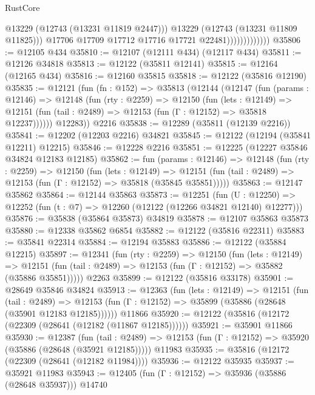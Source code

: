\begin{lexlean}{RustCore}
\begin{coremodule}
                                  @13229
                                  (@12743 (@13231 @11819 @2447)))
                                @13229
                                (@12743 (@13231 @11809 @11825)))
                              @17706
                              @17709
                              @17712
                              @17716
                              @17721
                              @22481)))))))))))))
@35806 := @12105 @434
@35810 := @12107 (@12111 @434) (@12117 @434)
@35811 := @12126 @34818
@35813 := @12122 (@35811 @12141)
@35815 := @12164 (@12165 @434)
@35816 := @12160 @35815
@35818 := @12122 (@35816 @12190)
@35835 := @12121
    (fun (fn : @152) =>
    @35813
      (@12144
        (@12147
          (fun (params : @12146) =>
          @12148
            (fun (rty : @2259) =>
            @12150
              (fun (lets : @12149) =>
              @12151 (fun (tail : @2489) => @12153 (fun (Γ : @12152) => @35818 @12237))))))
        @12283))
    @2216
@35838 := @12289 (@35811 (@12139 @2216))
@35841 := @12202 (@12203 @2216) @34821
@35845 := @12122 (@12194 (@35841 @12211) @12215)
@35846 := @12228 @2216
@35851 := @12225 (@12227 @35846 @34824 @12183 @12185)
@35862 := fun (params : @12146) =>
  @12148
    (fun (rty : @2259) =>
    @12150
      (fun (lets : @12149) =>
      @12151 (fun (tail : @2489) => @12153 (fun (Γ : @12152) => @35818 (@35845 @35851)))))
@35863 := @12147 @35862
@35864 := @12144 @35863
@35873 := @12251
    (fun (U : @12250) => @12252 (fun (t : @7) => @12260 (@12122 (@12266 @34821 @12140) @12277)))
@35876 := @35838 (@35864 @35873) @34819
@35878 := @12107 @35863 @35873
@35880 := @12338 @35862 @6854
@35882 := @12122 (@35816 @22311)
@35883 := @35841 @22314
@35884 := @12194 @35883
@35886 := @12122 (@35884 @12215)
@35897 := @12341
    (fun (rty : @2259) =>
    @12150
      (fun (lets : @12149) =>
      @12151 (fun (tail : @2489) => @12153 (fun (Γ : @12152) => @35882 (@35886 @35851)))))
    @2263
@35899 := @12122 (@35816 @33178)
@35901 := @28649 @35846 @34824
@35913 := @12363
    (fun (lets : @12149) =>
    @12151
      (fun (tail : @2489) =>
      @12153 (fun (Γ : @12152) => @35899 (@35886 (@28648 (@35901 @12183 @12185))))))
    @11866
@35920 := @12122 (@35816 (@12172 (@22309 (@28641 (@12182 (@11867 @12185))))))
@35921 := @35901 @11866
@35930 := @12387
    (fun (tail : @2489) => @12153 (fun (Γ : @12152) => @35920 (@35886 (@28648 (@35921 @12185)))))
    @11983
@35935 := @35816 (@12172 (@22309 (@28641 (@12182 @11984))))
@35936 := @12122 @35935
@35937 := @35921 @11983
@35943 := @12405 (fun (Γ : @12152) => @35936 (@35886 (@28648 @35937))) @14740

\end{coremodule}
\end{lexlean}
